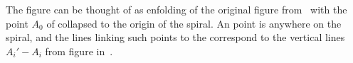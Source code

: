 The figure can be thought of as enfolding of the original figure
from~ with the point $A_0$ of  collapsed
to the origin of the spiral.  An 
point is anywhere on the spiral, and the lines linking such points to the
 correspond to the vertical lines $A_i'-A_i$ from figure
in~.
\begin{center}
\epsfxsize=5cm
\end{center}\label{fig:onetime}  


